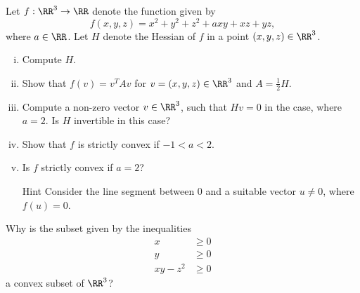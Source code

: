 \documentclass{article}
\begin{document}
\beginshex
Let $f:\RR^3\rightarrow \RR$ denote the function given by
$$
f(x, y, z) = x^2 + y^2 + z^2 +  a x y +  x z +  y z,
$$
where $a\in \RR$. Let $H$ denote the Hessian of
$f$ in a point $(x, y, z)\in \RR^3$.

\begin{enumerate}[(i)]
\item
  Compute $H$.
\item
  Show that $f(v) = v^T A v$ for $v=(x, y, z)\in \RR^3$ and $A = \frac{1}{2} H$.
\item
  Compute a non-zero vector $v\in \RR^3$, such that $H v = 0$ in
  the case, where $a=2$. Is $H$ invertible in this case?
\item
  Show that $f$ is strictly convex if $-1 < a < 2$.
\item
  Is $f$ strictly convex if $a=2$?

  \begin{hideinbutton}{Hint}
    Consider the line segment between $0$ and a suitable vector
    $u\neq 0$, where $f(u) = 0$.

    
  \end{hideinbutton}
\end{enumerate}
\endshex

\beginshex
Why is the subset given by the inequalities
  \begin{align*}
    x &\geq 0\\
    y &\geq 0\\
    x y - z^2 &\geq 0
  \end{align*}
  a convex subset of $\RR^3$?
\endshex
\end{document}
